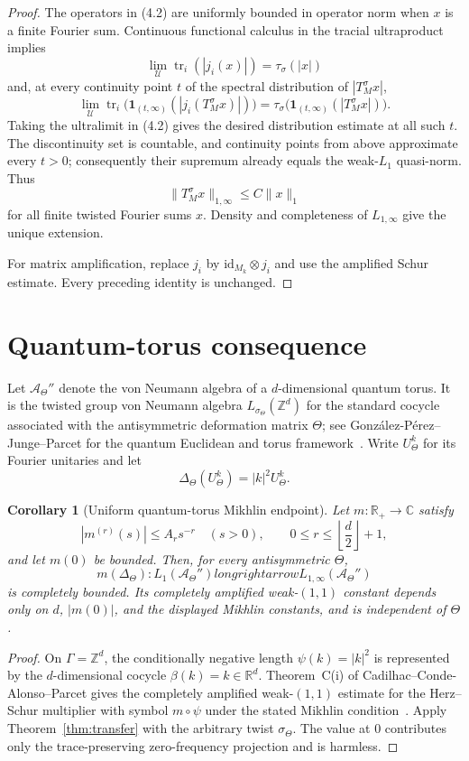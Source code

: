 \documentclass[11pt]{article}
\newtheorem{corollary}[theorem]{Corollary}
\theoremstyle{remark}
\newcommand{\C}{\mathbb C}
\newcommand{\id}{\mathrm{id}}
\newcommand{\one}{\mathbf 1}
\begin{document}
\begin{proof}
The operators in (4.2) are uniformly bounded in operator norm when $x$ is a
finite Fourier sum. Continuous functional calculus in the tracial
ultraproduct implies
\[
 \lim_{\mathcal U}\operatorname{tr}_i(|j_i(x)|)=\tau_\sigma(|x|)
\]
and, at every continuity point $t$ of the spectral distribution of
$|T_M^\sigma x|$,
\[
 \lim_{\mathcal U}\operatorname{tr}_i
 \big(\one_{(t,\infty)}(|j_i(T_M^\sigma x)|)\big)
 =\tau_\sigma\big(\one_{(t,\infty)}(|T_M^\sigma x|)\big).
\]
Taking the ultralimit in (4.2) gives the desired distribution estimate at
all such $t$. The discontinuity set is countable, and continuity points
from above approximate every $t>0$; consequently their supremum already
equals the weak-$L_1$ quasi-norm. Thus
\[
 \|T_M^\sigma x\|_{1,\infty}\le C\|x\|_1
\]
for all finite twisted Fourier sums $x$. Density and completeness of
$L_{1,\infty}$ give the unique extension.

For matrix amplification, replace $j_i$ by $\id_{M_k}\otimes j_i$ and use
the amplified Schur estimate. Every preceding identity is unchanged.
\end{proof}

\section{Quantum-torus consequence}

Let $\mathcal A_\Theta''$ denote the von Neumann algebra of a $d$-dimensional
quantum torus. It is the twisted group von Neumann algebra
$L_{\sigma_\Theta}(\mathbb Z^d)$ for the standard cocycle associated with
the antisymmetric deformation matrix $\Theta$; see
Gonz\'alez-P\'erez--Junge--Parcet for the quantum Euclidean and torus
framework~\cite{quantum}. Write $U_\Theta^k$ for its Fourier unitaries and
let
\[
 \Delta_\Theta(U_\Theta^k)=|k|^2U_\Theta^k.
\]

\begin{corollary}[Uniform quantum-torus Mikhlin endpoint]
Let $m:\mathbb R_+\to\C$ satisfy
\[
 |m^{(r)}(s)|\le A_rs^{-r}
 \quad(s>0),\qquad
 0\le r\le \left\lfloor\frac d2\right\rfloor+1,
\]
and let $m(0)$ be bounded. Then, for every antisymmetric $\Theta$,
\[
 m(\Delta_\Theta):L_1(\mathcal A_\Theta'')longrightarrow
 L_{1,\infty}(\mathcal A_\Theta'')
\]
is completely bounded. Its completely amplified weak-$(1,1)$ constant
depends only on $d$, $|m(0)|$, and the displayed Mikhlin constants, and is
independent of $\Theta$.
\end{corollary}

\begin{proof}
On $\Gamma=\mathbb Z^d$, the conditionally negative length
$\psi(k)=|k|^2$ is represented by the $d$-dimensional cocycle
$\beta(k)=k\in\mathbb R^d$. Theorem~C(i) of
Cadilhac--Conde-Alonso--Parcet gives the completely amplified weak-$(1,1)$
estimate for the Herz--Schur multiplier with symbol $m\circ\psi$ under the
stated Mikhlin condition~\cite{source}. Apply
Theorem~\ref{thm:transfer} with the arbitrary twist $\sigma_\Theta$.
The value at $0$ contributes only the trace-preserving zero-frequency
projection and is harmless.
\end{proof}
\end{document}
